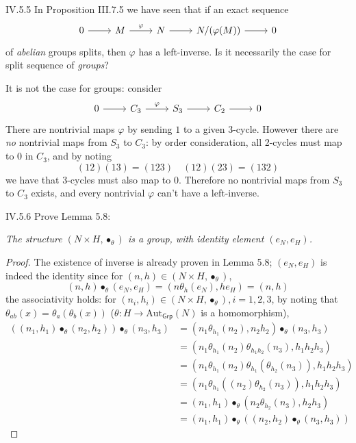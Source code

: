\begin{problem}{IV.5.5}
In Proposition III.7.5 we have seen that if an exact sequence
\[
\begin{tikzcd}
0 \arrow[r] &M \arrow[r, "\varphi"] &N \arrow[r] &N/(\varphi(M)) \arrow[r] &0
\end{tikzcd}	
\]
of \emph{abelian} groups splits, then $\varphi$ has a left-inverse. Is it necessarily the case for split sequence of \emph{groups}?
\end{problem}
\begin{solution}
It is not the case for groups: consider
\[
\begin{tikzcd}
0 \arrow[r] &C_3 \arrow[r, "\varphi"] &S_3 \arrow[r] &C_2 \arrow[r] &0
\end{tikzcd}
\]
There are nontrivial maps $\varphi$ by sending $1$ to a given 3-cycle. However there are \emph{no} nontrivial maps from $S_3$ to $C_3$: by order consideration, all 2-cycles must map to $0$ in $C_3$, and by noting
\[
(12)(13) = (1 2 3) \quad (1 2)(2 3) = (1 3 2)
\]
we have that 3-cycles must also map to $0$. Therefore no nontrivial maps from $S_3$ to $C_3$ exists, and every nontrivial $\varphi$ can't have a left-inverse. 
\end{solution}

\begin{problem}{IV.5.6}
Prove Lemma 5.8: 

\textit{
The structure $(N \times H, \bullet_\theta)$ is a group, with identity element $(e_N, e_H)$.
}
\end{problem}
\begin{proof}
The existence of inverse is already proven in Lemma 5.8; $(e_N, e_H)$ is indeed the identity since for $(n,h)\in (N \times H, \bullet_\theta)$,
\[
(n, h) \bullet_\theta (e_N, e_H) = (n\theta_h(e_N), he_H) = (n, h)
\]
the associativity holds: for $(n_i,h_i)\in (N \times H, \bullet_\theta), i = 1,2,3$, by noting that $\theta_{ab}(x) = \theta_a(\theta_b(x))$ ($\theta : H \to \text{Aut}_\mathsf{Grp}(N)$ is a homomorphism), 
\begin{align*}
((n_1, h_1) \bullet_\theta (n_2, h_2)) \bullet_\theta (n_3,h_3) &= (n_1 \theta_{h_1}(n_2), n_2h_2) \bullet_\theta (n_3,h_3) \\
&= (n_1 \theta_{h_1}(n_2) \theta_{h_1h_2}(n_3), h_1h_2h_3) \\
&= (n_1 \theta_{h_1}(n_2) \theta_{h_1}(\theta_{h_2}(n_3)), h_1h_2h_3) \\
&= (n_1 \theta_{h_1}((n_2)\theta_{h_2}(n_3)), h_1h_2h_3) \\
&= (n_1, h_1) \bullet_\theta (n_2\theta_{h_2}(n_3), h_2h_3) \\
&= (n_1, h_1) \bullet_\theta ((n_2, h_2) \bullet_\theta (n_3,h_3))
\end{align*}
\end{proof}


